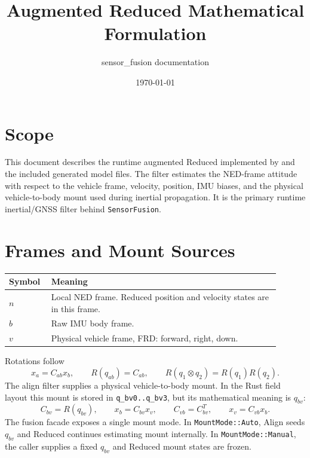 \documentclass[11pt]{article}
\title{Augmented Reduced Mathematical Formulation}
\author{sensor\_fusion documentation}
\date{\today}
\newcommand{\T}{^{T}}
\begin{document}
\maketitle
\tableofcontents
\newpage

\section{Scope}

This document describes the runtime augmented Reduced implemented by
 and the included generated model files. The
filter estimates the NED-frame attitude with respect to the vehicle frame,
velocity, position, IMU biases, and the physical vehicle-to-body mount used
during inertial propagation.
It is the primary runtime inertial/GNSS filter behind \texttt{SensorFusion}.

\section{Frames and Mount Sources}

\begin{longtable}{>{\raggedright\arraybackslash}p{0.12\linewidth} >{\raggedright\arraybackslash}p{0.78\linewidth}}
\toprule
\textbf{Symbol} & \textbf{Meaning} \\
\midrule
\(n\) & Local NED frame. Reduced position and velocity states are in this frame. \\
\(b\) & Raw IMU body frame. \\
\(v\) & Physical vehicle frame, FRD: forward, right, down. \\
\bottomrule
\end{longtable}

Rotations follow
\begin{equation}
  x_a=C_{ab}x_b,\qquad R(q_{ab})=C_{ab},\qquad
  R(q_1\otimes q_2)=R(q_1)R(q_2).
\end{equation}
The align filter supplies a physical vehicle-to-body mount. In the Rust field
layout this mount is stored in \texttt{q_bv0..q_bv3}, but its mathematical meaning
is \(q_{bv}\):
\begin{equation}
  C_{bv}=R(q_{bv}),\qquad x_b=C_{bv}x_v,\qquad
  C_{vb}=C_{bv}\T,\qquad x_v=C_{vb}x_b .
\end{equation}
The fusion facade exposes a single mount mode. In \texttt{MountMode::Auto},
Align seeds \(q_{bv}\) and Reduced continues estimating mount internally. In
\texttt{MountMode::Manual}, the caller supplies a fixed \(q_{bv}\) and Reduced
mount states are frozen.
\end{document}
